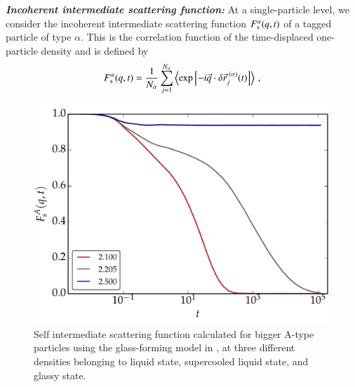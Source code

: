     
    

    {\bf \em Incoherent intermediate scattering function:} At a single-particle level, we consider the incoherent intermediate scattering function $F_{\rm s}^{\alpha}(q,t)$ of a tagged particle of type $\alpha$. This is the correlation function of the time-displaced one-particle density and is defined by \cite{hansen2013}
    \begin{equation}
    F_{\rm s}^{\alpha}(q,t) = \frac{1}{N_{\alpha}}  \sum_{j=1}^{N_\alpha} \left\langle \exp \left[ -i \vec{q}\cdot {\delta \vec{r}_j^{\; (\alpha)}(t)} \right] \right\rangle \, ,
    \end{equation}
    
    \begin{figure}[hbt!]
	\includegraphics[width=14cm]{figs/fig_fsqt.pdf}
	\centering
	\caption[{\em Self intermediate scattering function}]{Self intermediate scattering function calculated for bigger A-type particles using the glass-forming model in \cite{vaibhav2022finite}, at three different densities belonging to liquid state, supercooled liquid state, and glassy state.\label{fig_fsqt}}
    \end{figure} 
    
